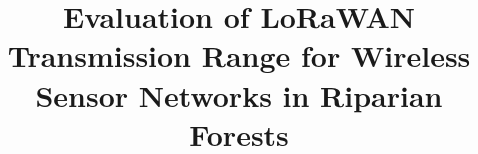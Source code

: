 %
%
%
%
%
%
\documentclass[smallextended,natbib]{svjour3}       %
%
\smartqed  %
%
\usepackage{amsmath}
\usepackage{booktabs}
\usepackage[T1]{fontenc}
\usepackage[utf8]{inputenc}
\usepackage{float}
\usepackage{graphicx}
\usepackage{booktabs}
\usepackage{enumitem}
\usepackage[hyphens]{url}

%
%
%
%


\title{Evaluation of LoRaWAN Transmission Range for Wireless Sensor Networks in Riparian Forests%
}


